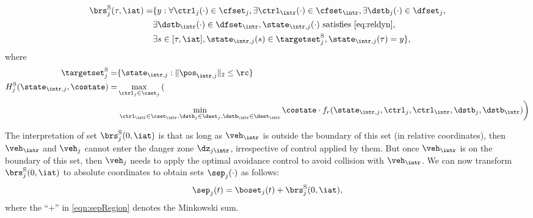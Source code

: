 \begin{equation} \label{eqn:sepBRS}
\begin{aligned}
\brs^{\text{S}}_{j}(\tau, \iat) = & \{y: \forall \ctrl_j(\cdot) \in \cfset_j, \exists \ctrl_\intr(\cdot) \in \cfset_\intr, \exists \dstb_j(\cdot) \in \dfset_j, \\
& \exists \dstb_\intr(\cdot) \in \dfset_\intr, \state_{\intr, j}(\cdot) \text{ satisfies \eqref{eq:reldyn}},\\
& \exists s \in [\tau, \iat], \state_{\intr, j}(s) \in \targetset^{\text{S}}_{j}, \state_{\intr, j}(\tau) = y\},
\end{aligned}
\end{equation}
where 
\begin{equation}
\begin{aligned}
\targetset^{\text{S}}_{j} = & \{\state_{\intr, j}: \|\pos_{\intr, j}\|_2 \le \rc\} \\
H^{\text{S}}_{j}(\state_{\intr, j}, \costate) = & \max_{\ctrl_j \in \cset_j} \left( \right.\\
&\left. \min_{\ctrl_\intr \in \cset_\intr, \dstb_j \in \dset_j, \dstb_\intr \in \dset_\intr} \costate \cdot f_r(\state_{\intr, j}, \ctrl_j, \ctrl_\intr, \dstb_j, \dstb_\intr) \right)
\end{aligned}
\end{equation}

The interpretation of set $\brs^{\text{S}}_{j}(0, \iat)$ is that as long as $\veh_{\intr}$ is outside the boundary of this set (in relative coordinates), then $\veh_{\intr}$ and $\veh_{j}$ cannot enter the danger zone $\dz_{j\intr}$, irrespective of control applied by them. But once $\veh_{\intr}$ is on the boundary of this set, then $\veh_{j}$ needs to apply the optimal avoidance control to avoid collision with $\veh_{\intr}$. We can now transform $\brs^{\text{S}}_{j}(0, \iat)$ to absolute coordinates to obtain sets $\sep_j(\cdot)$ as follows:
\begin{equation} \label{eqn:sepRegion}
\sep_j(t) = \boset_j(t) + \brs^{\text{S}}_{j}(0, \iat),
\end{equation}
where the ``$+$'' in \eqref{eqn:sepRegion} denotes the Minkowski sum.